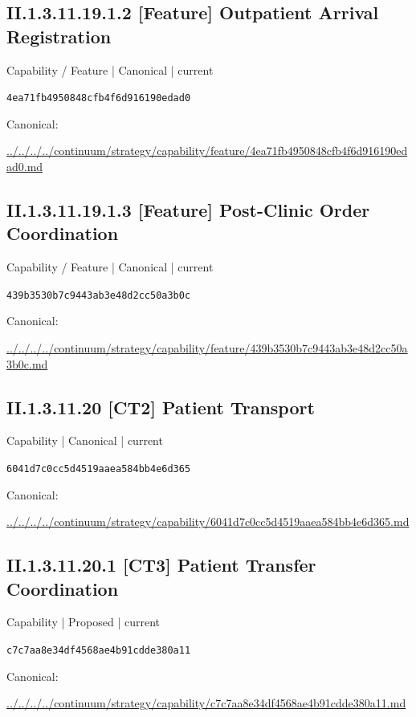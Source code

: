 \documentclass[10pt,a4paper]{article}
\begin{document}
\subsection*{II.1.3.11.19.1.2 [Feature] Outpatient Arrival Registration}
{\small Capability / Feature | Canonical | current}\par
\texttt{4ea71fb4950848cfb4f6d916190edad0}\par
Canonical: \par
{\footnotesize\url{../../../../continuum/strategy/capability/feature/4ea71fb4950848cfb4f6d916190edad0.md}}\par
\subsection*{II.1.3.11.19.1.3 [Feature] Post-Clinic Order Coordination}
{\small Capability / Feature | Canonical | current}\par
\texttt{439b3530b7c9443ab3e48d2cc50a3b0c}\par
Canonical: \par
{\footnotesize\url{../../../../continuum/strategy/capability/feature/439b3530b7c9443ab3e48d2cc50a3b0c.md}}\par
\subsection*{II.1.3.11.20 [CT2] Patient Transport}
{\small Capability | Canonical | current}\par
\texttt{6041d7c0cc5d4519aaea584bb4e6d365}\par
Canonical: \par
{\footnotesize\url{../../../../continuum/strategy/capability/6041d7c0cc5d4519aaea584bb4e6d365.md}}\par
\subsection*{II.1.3.11.20.1 [CT3] Patient Transfer Coordination}
{\small Capability | Proposed | current}\par
\texttt{c7c7aa8e34df4568ae4b91cdde380a11}\par
Canonical: \par
{\footnotesize\url{../../../../continuum/strategy/capability/c7c7aa8e34df4568ae4b91cdde380a11.md}}\par
\end{document}
